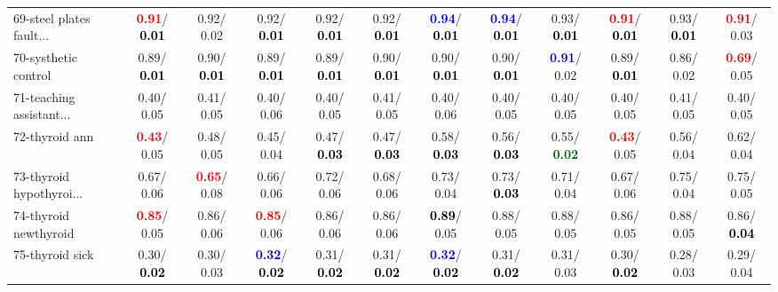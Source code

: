 \begin{table}[h]
\begin{center}
{\begin{tabular}{lc|c|c|c|c|c|c|c|c|c|c}
69-steel plates fault... & \textcolor{red}{\textbf{  0.91}}/\textcolor{black}{\textbf{  0.01}} &   0.92/  0.02 &   0.92/\textcolor{black}{\textbf{  0.01}} &   0.92/\textcolor{black}{\textbf{  0.01}} &   0.92/\textcolor{black}{\textbf{  0.01}} & \textcolor{blue}{\textbf{  0.94}}/\textcolor{black}{\textbf{  0.01}} & \textcolor{blue}{\textbf{  0.94}}/\textcolor{black}{\textbf{  0.01}} &   0.93/\textcolor{black}{\textbf{  0.01}} & \textcolor{red}{\textbf{  0.91}}/\textcolor{black}{\textbf{  0.01}} &   0.93/\textcolor{black}{\textbf{  0.01}} & \textcolor{red}{\textbf{  0.91}}/  0.03 \\
70-systhetic control &   0.89/\textcolor{black}{\textbf{  0.01}} &   0.90/\textcolor{black}{\textbf{  0.01}} &   0.89/\textcolor{black}{\textbf{  0.01}} &   0.89/\textcolor{black}{\textbf{  0.01}} &   0.90/\textcolor{black}{\textbf{  0.01}} &   0.90/\textcolor{black}{\textbf{  0.01}} &   0.90/\textcolor{black}{\textbf{  0.01}} & \textcolor{blue}{\textbf{  0.91}}/  0.02 &   0.89/\textcolor{black}{\textbf{  0.01}} &   0.86/  0.02 & \textcolor{red}{\textbf{  0.69}}/  0.05 \\
71-teaching assistant... &   0.40/  0.05 &   0.41/  0.05 &   0.40/  0.06 &   0.40/  0.05 &   0.41/  0.05 &   0.40/  0.06 &   0.40/  0.05 &   0.40/  0.05 &   0.40/  0.05 &   0.41/  0.05 &   0.40/  0.05 \\ \hline
72-thyroid ann & \textcolor{red}{\textbf{  0.43}}/  0.05 &   0.48/  0.05 &   0.45/  0.04 &   0.47/\textcolor{black}{\textbf{  0.03}} &   0.47/\textcolor{black}{\textbf{  0.03}} &   0.58/\textcolor{black}{\textbf{  0.03}} &   0.56/\textcolor{black}{\textbf{  0.03}} &   0.55/\textcolor{darkgreen}{\textbf{  0.02}} & \textcolor{red}{\textbf{  0.43}}/  0.05 &   0.56/  0.04 &   0.62/  0.04 \\
73-thyroid hypothyroi... &   0.67/  0.06 & \textcolor{red}{\textbf{  0.65}}/  0.08 &   0.66/  0.06 &   0.72/  0.06 &   0.68/  0.06 &   0.73/  0.04 &   0.73/\textcolor{black}{\textbf{  0.03}} &   0.71/  0.04 &   0.67/  0.06 &   0.75/  0.04 &   0.75/  0.05 \\
74-thyroid newthyroid & \textcolor{red}{\textbf{  0.85}}/  0.05 &   0.86/  0.06 & \textcolor{red}{\textbf{  0.85}}/  0.06 &   0.86/  0.06 &   0.86/  0.06 & \textcolor{black}{\textbf{  0.89}}/  0.05 &   0.88/  0.05 &   0.88/  0.05 &   0.86/  0.05 &   0.88/  0.05 &   0.86/\textcolor{black}{\textbf{  0.04}} \\
75-thyroid sick &   0.30/\textcolor{black}{\textbf{  0.02}} &   0.30/  0.03 & \textcolor{blue}{\textbf{  0.32}}/\textcolor{black}{\textbf{  0.02}} &   0.31/\textcolor{black}{\textbf{  0.02}} &   0.31/\textcolor{black}{\textbf{  0.02}} & \textcolor{blue}{\textbf{  0.32}}/\textcolor{black}{\textbf{  0.02}} &   0.31/\textcolor{black}{\textbf{  0.02}} &   0.31/  0.03 &   0.30/\textcolor{black}{\textbf{  0.02}} &   0.28/  0.03 &   0.29/  0.04 \\

\end{tabular}}
\end{center}
\end{table}
